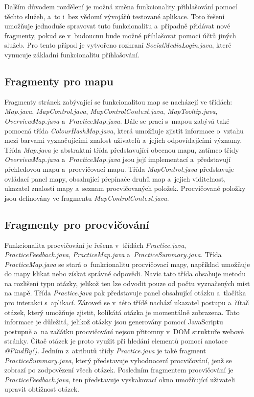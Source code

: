 \documentclass[
    color,   %
	table,   %
    twoside, %
    nolot, nolof,
]{fithesis3}
\begin{document}
Dalším důvodem rozdělení je možná změna funkcionality přihlašování pomocí těchto služeb, a~to i~bez vědomí vývojářů testované aplikace. Toto řešení umožňuje jednoduše spravovat tuto funkcionalitu a~případně přidávat nové fragmenty, pokud se v~budoucnu bude možné přihlašovat pomocí účtů jiných služeb. Pro tento případ je vytvořeno rozhraní \emph{SocialMediaLogin.java}, které vynucuje základní funkcionalitu přihlašování.

\subsection*{Fragmenty pro mapu}
Fragmenty stránek zabývající se funkcionalitou map se nacházejí ve třídách: \emph{Map.java}, \emph{MapControl.java}, \emph{MapControlContext.java}, \emph{MapTooltip.java}, \emph{OverviewMap.java} a~\emph{PracticeMap.java}. Dále se prací s~mapou zabývá také pomocná třída \emph{ColourHashMap.java}, která umožňuje zjistit informace o~vztahu mezi barvami vyznačujícími znalost uživatelů a~jejich odpovídajícími významy. Třída \emph{Map.java} je abstraktní třída představující obecnou mapu, zatímco třídy \emph{OverviewMap.java} a~\emph{PracticeMap.java} jsou její implementací a~představují přehledovou mapu a~procvičovací mapu. Třída \emph{MapControl.java} představuje ovládací panel mapy, obsahující přepínače druhů map a~jejich viditelnost, ukazatel znalosti mapy a~seznam procvičovaných položek. Procvičované položky jsou definovány ve fragmentu \emph{MapControlContext.java}.

\subsection*{Fragmenty pro procvičování}
Funkcionalita procvičování je řešena v~třídách \emph{Practice.java}, \emph{PracticeFeedback.java}, \emph{PracticeMap.java} a~\emph{PracticeSummary.java}. Třída \emph{PracticeMap.java} se stará o~funkcionalitu procvičovací mapy, například umožňuje do mapy klikat nebo získat správné odpovědi. Navíc tato třída obsahuje metodu na rozlišení typu otázky, jelikož ten lze odvodit pouze od počtu vyznačených míst na mapě. Třída \emph{Practice.java} pak představuje panel obsahující otázku a~tlačítka pro interakci s~aplikací. Zároveň se v~této třídě nachází ukazatel postupu a~čítač otázek, který umožňuje zjistit, kolikátá otázka je momentálně zobrazena. Tato informace je důležitá, jelikož otázky jsou generovány pomocí JavaScriptu postupně a~na začátku procvičování nejsou přitomny v~DOM struktuře webové stránky. Čítač otázek je proto využit při hledání elementů pomocí anotace \emph{@FindBy()}. Jedním z~atributů třídy \emph{Practice.java} je také fragment \emph{PracticeSummary.java}, který představuje vyhodnocení procvičování, jenž se zobrazí po zodpovězení všech otázek. Posledním fragmentem procvičování je \emph{PracticeFeedback.java}, ten představuje vyskakovací okno umožňující uživateli upravit obtížnost otázek.
\end{document}
